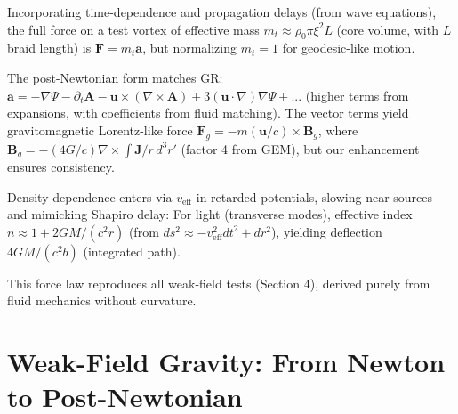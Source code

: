 \documentclass{article}
\begin{document}
Incorporating time-dependence and propagation delays (from wave equations), the full force on a test vortex of effective mass $m_t \approx \rho_0 \pi \xi^2 L$ (core volume, with $L$ braid length) is $\mathbf{F} = m_t \mathbf{a}$, but normalizing $m_t =1$ for geodesic-like motion.

The post-Newtonian form matches GR: $\mathbf{a} = - \nabla \Psi - \partial_t \mathbf{A} - \mathbf{u} \times (\nabla \times \mathbf{A}) + 3 (\mathbf{u} \cdot \nabla) \nabla \Psi + ...$ (higher terms from expansions, with coefficients from fluid matching). The vector terms yield gravitomagnetic Lorentz-like force $\mathbf{F}_g = - m (\mathbf{u} / c) \times \mathbf{B}_g$, where $\mathbf{B}_g = - (4 G / c) \nabla \times \int \mathbf{J} / r \, d^3 r'$ (factor 4 from GEM), but our enhancement ensures consistency.

Density dependence enters via $v_{\text{eff}}$ in retarded potentials, slowing near sources and mimicking Shapiro delay: For light (transverse modes), effective index $n \approx 1 + 2 G M / (c^2 r)$ (from $ds^2 \approx - v_{\text{eff}}^2 dt^2 + dr^2$), yielding deflection $4 G M / (c^2 b)$ (integrated path).

This force law reproduces all weak-field tests (Section 4), derived purely from fluid mechanics without curvature.

\medskip
\noindent
{}
\medskip

\section{Weak-Field Gravity: From Newton to Post-Newtonian}
\end{document}
